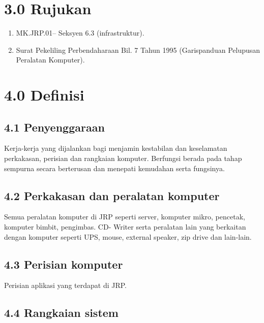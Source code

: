 \documentclass[
]{article}
\begin{document}
\hypertarget{rujukan}{%
\section{3.0 Rujukan}\label{rujukan}}

\begin{enumerate}
\def\labelenumi{\roman{enumi})}
\item
  MK.JRP.01-- Seksyen 6.3 (infrastruktur).
\item
  Surat Pekeliling Perbendaharaan Bil. 7 Tahun 1995 (Garispanduan
  Pelupusan Peralatan Komputer).
\end{enumerate}

\hypertarget{definisi}{%
\section{4.0 Definisi}\label{definisi}}

\hypertarget{penyenggaraan}{%
\subsection{4.1 Penyenggaraan}\label{penyenggaraan}}

Kerja-kerja yang dijalankan bagi menjamin kestabilan dan keselamatan
perkakasan, perisian dan rangkaian komputer. Berfungsi berada pada tahap
sempurna secara berterusan dan menepati kemudahan serta fungsinya.

\hypertarget{perkakasan-dan-peralatan-komputer}{%
\subsection{4.2 Perkakasan dan peralatan
komputer}\label{perkakasan-dan-peralatan-komputer}}

Semua peralatan komputer di JRP seperti server, komputer mikro,
pencetak, komputer bimbit, pengimbas. CD- Writer serta peralatan lain
yang berkaitan dengan komputer seperti UPS, mouse, external speaker, zip
drive dan lain-lain.

\hypertarget{perisian-komputer}{%
\subsection{4.3 Perisian komputer}\label{perisian-komputer}}

Perisian aplikasi yang terdapat di JRP.

\hypertarget{rangkaian-sistem}{%
\subsection{4.4 Rangkaian sistem}\label{rangkaian-sistem}}
\end{document}
